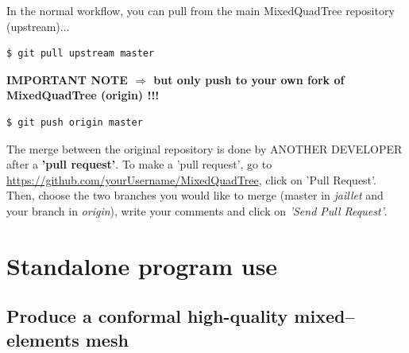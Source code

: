 \documentclass[10pt]{article}
\begin{document}
In the normal workflow, you can pull from the main MixedQuadTree repository (upstream)...
%
\begin{verbatim}
$ git pull upstream master
\end{verbatim}
 
\textbf{IMPORTANT NOTE $\Rightarrow$ but only push to your own fork of MixedQuadTree (origin) !!!}

\begin{verbatim}
$ git push origin master
\end{verbatim}

The merge between the original repository is done by ANOTHER DEVELOPER after a \textbf{'pull request'}.
To make a 'pull request', go to \url{https://github.com/yourUsername/MixedQuadTree}, click on 'Pull Request'. Then, choose the two branches you would like to merge (master in \textit{jaillet} and your branch in \textit{origin}), write your comments and click on \textit{'Send Pull Request'}.


\section{Standalone program use}
\label{standalone}

\subsection{Produce a conformal high-quality mixed--elements mesh}
\label{s:generatemesh}
\end{document}
